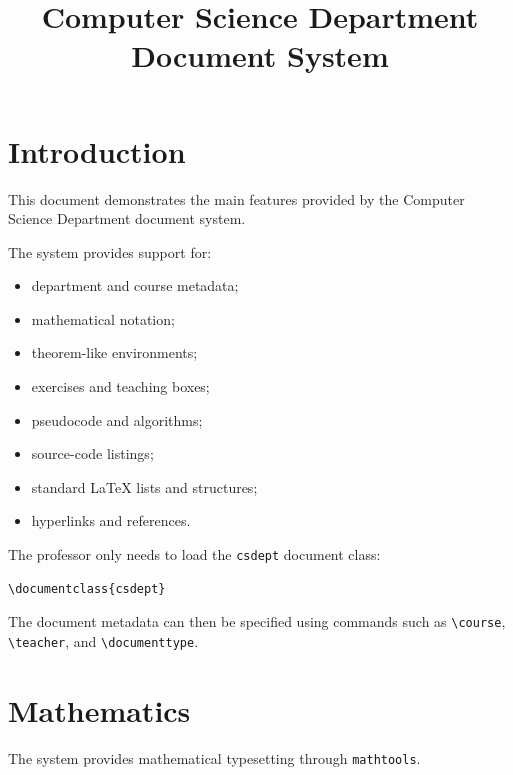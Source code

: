 \documentclass{csdept}
\title{Computer Science Department Document System}
\begin{document}
\maketitle

\tableofcontents

\newpage

\section{Introduction}

This document demonstrates the main features provided by the
Computer Science Department document system.

The system provides support for:

\begin{itemize}
    \item department and course metadata;
    \item mathematical notation;
    \item theorem-like environments;
    \item exercises and teaching boxes;
    \item pseudocode and algorithms;
    \item source-code listings;
    \item standard LaTeX lists and structures;
    \item hyperlinks and references.
\end{itemize}

The professor only needs to load the \texttt{csdept} document class:

\begin{verbatim}
\documentclass{csdept}
\end{verbatim}

The document metadata can then be specified using commands such as
\texttt{\textbackslash course}, \texttt{\textbackslash teacher},
and \texttt{\textbackslash documenttype}.

\section{Mathematics}

The system provides mathematical typesetting through
\texttt{mathtools}.
\end{document}
